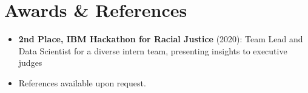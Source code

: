 \documentclass[11pt,a4paper,sans]{moderncv}
\begin{document}

\section{Awards \& References}
\vspace{1pt}
\begin{itemize}
\item \textbf{2nd Place, IBM Hackathon for Racial Justice} (2020): Team Lead and Data Scientist for a diverse intern team, presenting insights to executive judges
\item References available upon request.
\end{itemize}
\end{document}
